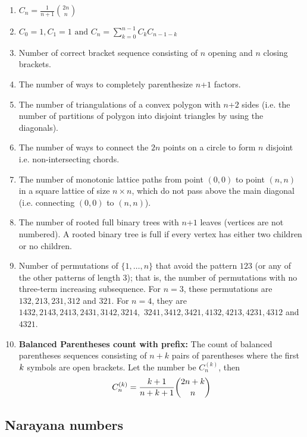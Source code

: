 \begin{enumerate}[resume]
    \item $\displaystyle C_n=\frac{1}{n+1}{2n \choose n}$
    \item $\displaystyle C_0=1,C_1=1\text{ and }C_n=\sum \limits_{k=0}^{n-1}C_k C_{n-1-k}$
    \item Number of correct bracket sequence consisting of $n$ opening and $n$ closing brackets.
    \item The number of ways to completely parenthesize $n$+$\displaystyle 1$ factors.
    \item The number of triangulations of a convex polygon with $n$+$\displaystyle 2$ sides (i.e. the number of partitions of polygon into disjoint triangles by using the diagonals).
    \item The number of ways to connect the $\displaystyle 2n$ points on a circle to form $n$ disjoint i.e. non-intersecting chords.
    \item The number of monotonic lattice paths from point $\displaystyle (0,0)$ to point $\displaystyle (n,n)$ in a square lattice of size $n\times n$, which do not pass above the main diagonal (i.e. connecting $\displaystyle (0,0)$ to $\displaystyle (n,n)$).
    \item The number of rooted full binary trees with $n$+$\displaystyle 1$ leaves (vertices are not numbered). A rooted binary tree is full if every vertex has either two children or no children.
    \item Number of permutations of $\{1, \dots, n\}$ that avoid the pattern $123$ (or any of the other patterns of length $3$); that is, the number of permutations with no three-term increasing subsequence. For $n = 3$, these permutations are $132, 213, 231, 312$ and $321$. For $n = 4$, they are
          $1432, 2143, 2413, 2431, 3142, 3214,$ \newline $3241, 3412, 3421, 4132, 4213, 4231, 4312$ and $4321.$
    \item \textbf{Balanced Parentheses count with prefix:}
    The count of balanced parentheses sequences consisting of $n+k$ pairs of parentheses where the first $\displaystyle \displaystyle k$ symbols are open brackets. Let the number be $\displaystyle C_n^{(k)}$, then
    \[\displaystyle \displaystyle C_n^{(k)} = \frac{k+1}{n+k+1} \binom{2n+k}{n}\]
\end{enumerate}

\subsection{Narayana numbers}

